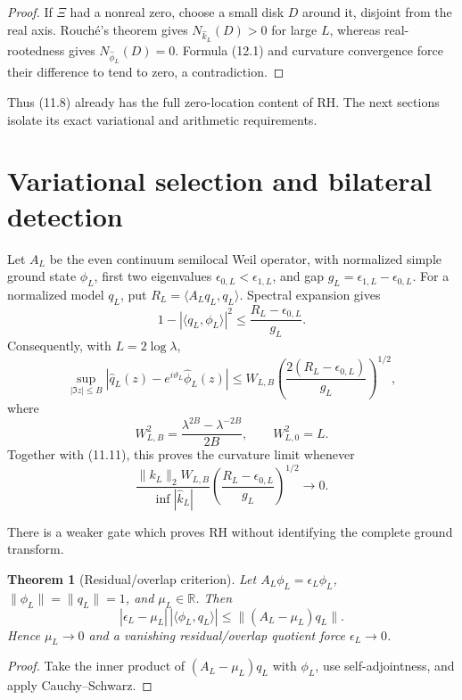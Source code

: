 \documentclass[11pt]{amsart}
\newtheorem{theorem}{Theorem}[section]
\theoremstyle{definition}
\theoremstyle{remark}
\newcommand{\R}{\mathbb R}
\newcommand{\XiR}{\Xi}
\begin{document}
\begin{proof}
If \(\XiR\) had a nonreal zero, choose a small disk \(D\) around it,
disjoint from the real axis.  Rouch\'e's theorem gives
\(N_{\widehat k_L}(D)>0\) for large \(L\), whereas real-rootedness gives
\(N_{\widehat\phi_L}(D)=0\).  Formula (12.1) and curvature convergence
force their difference to tend to zero, a contradiction.
\end{proof}

Thus (11.8) already has the full zero-location content of RH.  The next
sections isolate its exact variational and arithmetic requirements.

\section{Variational selection and bilateral detection}
\label{sec:selection}

Let \(A_L\) be the even continuum semilocal Weil operator, with normalized
simple ground state \(\phi_L\), first two eigenvalues
\(\epsilon_{0,L}<\epsilon_{1,L}\), and gap
\(g_L=\epsilon_{1,L}-\epsilon_{0,L}\).  For a normalized model \(q_L\),
put \(R_L=\langle A_Lq_L,q_L\rangle\).  Spectral expansion gives
\[
 1-|\langle q_L,\phi_L\rangle|^2
 \le\frac{R_L-\epsilon_{0,L}}{g_L}.
 \tag{13.1}
\]
Consequently, with \(L=2\log\lambda\),
\[
 \sup_{|\Im z|\le B}
 |\widehat q_L(z)-e^{i\vartheta_L}\widehat\phi_L(z)|
 \le W_{L,B}
 \left(\frac{2(R_L-\epsilon_{0,L})}{g_L}\right)^{1/2},
 \tag{13.2}
\]
where
\[
 W_{L,B}^2=\frac{\lambda^{2B}-\lambda^{-2B}}{2B},
 \qquad W_{L,0}^2=L.
\]
Together with (11.11), this proves the curvature limit whenever
\[
 \boxed{
 \frac{\|k_L\|_2W_{L,B}}{\inf|\widehat k_L|}
 \left(\frac{R_L-\epsilon_{0,L}}{g_L}\right)^{1/2}
 \longrightarrow0.}
 \tag{13.3}
\]

There is a weaker gate which proves RH without identifying the complete
ground transform.

\begin{theorem}[Residual/overlap criterion]
\label{thm:residual-overlap}
Let \(A_L\phi_L=\epsilon_L\phi_L\), \(\|\phi_L\|=\|q_L\|=1\), and
\(\mu_L\in\R\).  Then
\[
 \boxed{
 |\epsilon_L-\mu_L|\,|\langle\phi_L,q_L\rangle|
 \le\|(A_L-\mu_L)q_L\|.}
 \tag{13.4}
\]
Hence \(\mu_L\to0\) and a vanishing residual/overlap quotient force
\(\epsilon_L\to0\).
\end{theorem}

\begin{proof}
Take the inner product of \((A_L-\mu_L)q_L\) with \(\phi_L\), use
self-adjointness, and apply Cauchy--Schwarz.
\end{proof}
\end{document}
